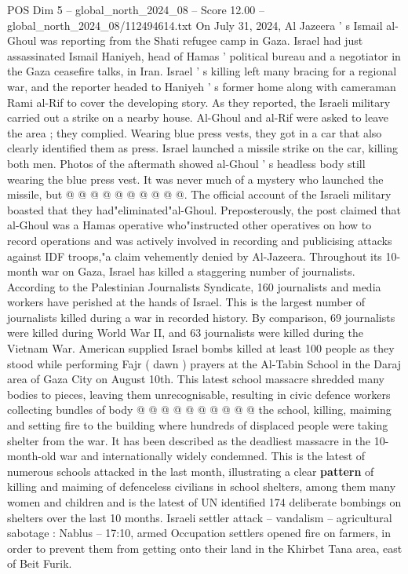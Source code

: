 \begin{textsample}{POS Dim 5 – global\_north\_2024\_08 – Score 12.00 – global\_north\_2024\_08/112494614.txt}
On July 31, 2024, Al Jazeera ' s Ismail al-Ghoul was reporting from the Shati refugee camp in Gaza.
Israel had just assassinated Ismail Haniyeh, head of Hamas ' political bureau and a negotiator in the Gaza ceasefire talks, in Iran.
Israel ' s killing left many bracing for a regional war, and the reporter headed to Haniyeh ' s former home along with cameraman Rami al-Rif to cover the developing story.
As they reported, the Israeli military carried out a strike on a nearby house.
Al-Ghoul and al-Rif were asked to leave the area ; they complied.
Wearing blue press vests, they got in a car that also clearly identified them as press.
Israel launched a missile strike on the car, killing both men.
Photos of the aftermath showed al-Ghoul ' s headless body still wearing the blue press vest.
It was never much of a mystery who launched the missile, but @ @ @ @ @ @ @ @ @ @.
The official account of the Israeli military boasted that they had"eliminated"al-Ghoul.
Preposterously, the post claimed that al-Ghoul was a Hamas operative who"instructed other operatives on how to record operations and was actively involved in recording and publicising attacks against IDF troops,"a claim vehemently denied by Al-Jazeera.
Throughout its 10-month war on Gaza, Israel has killed a staggering number of journalists.
According to the Palestinian Journalists Syndicate, 160 journalists and media workers have perished at the hands of Israel.
This is the largest number of journalists killed during a war in recorded history.
By comparison, 69 journalists were killed during World War II, and 63 journalists were killed during the Vietnam War.
American supplied Israel bombs killed at least 100 people as they stood while performing Fajr ( dawn ) prayers at the Al-Tabin School in the Daraj area of Gaza City on August 10th.
This latest school massacre shredded many bodies to pieces, leaving them unrecognisable, resulting in civic defence workers collecting bundles of body @ @ @ @ @ @ @ @ @ @ the school, killing, maiming and setting fire to the building where hundreds of displaced people were taking shelter from the war.
It has been described as the deadliest massacre in the 10-month-old war and internationally widely condemned.
This is the latest of numerous schools attacked in the last month, illustrating a clear \textbf{pattern} of killing and maiming of defenceless civilians in school shelters, among them many women and children and is the latest of UN identified 174 deliberate bombings on shelters over the last 10 months.
Israeli settler attack -- vandalism -- agricultural sabotage : Nablus -- 17:10, armed Occupation settlers opened fire on farmers, in order to prevent them from getting onto their land in the Khirbet Tana area, east of Beit Furik.

\end{textsample}
